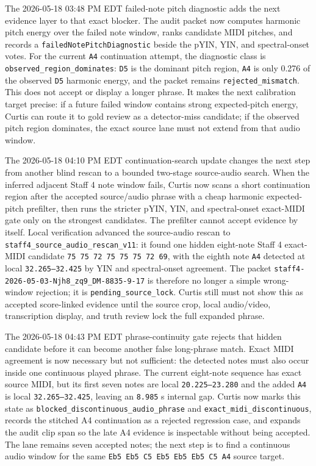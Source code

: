 \documentclass[12pt,letterpaper]{article}
\begin{document}
The 2026-05-18 03:48 PM EDT failed-note pitch diagnostic adds the next evidence layer to that exact blocker. The audit packet now computes harmonic pitch energy over the failed note window, ranks candidate MIDI pitches, and records a \texttt{failedNotePitchDiagnostic} beside the pYIN, YIN, and spectral-onset votes. For the current \texttt{A4} continuation attempt, the diagnostic class is \texttt{observed\_region\_dominates}: \texttt{D5} is the dominant pitch region, \texttt{A4} is only 0.276 of the observed \texttt{D5} harmonic energy, and the packet remains \texttt{rejected\_mismatch}. This does not accept or display a longer phrase. It makes the next calibration target precise: if a future failed window contains strong expected-pitch energy, Curtis can route it to gold review as a detector-miss candidate; if the observed pitch region dominates, the exact source lane must not extend from that audio window.

The 2026-05-18 04:10 PM EDT continuation-search update changes the next step from another blind rescan to a bounded two-stage source-audio search. When the inferred adjacent Staff 4 note window fails, Curtis now scans a short continuation region after the accepted source/audio phrase with a cheap harmonic expected-pitch prefilter, then runs the stricter pYIN, YIN, and spectral-onset exact-MIDI gate only on the strongest candidates. The prefilter cannot accept evidence by itself. Local verification advanced the source-audio rescan to \texttt{staff4\_source\_audio\_rescan\_v11}: it found one hidden eight-note Staff 4 exact-MIDI candidate \texttt{75 75 72 75 75 75 72 69}, with the eighth note \texttt{A4} detected at local \texttt{32.265--32.425} by YIN and spectral-onset agreement. The packet \texttt{staff4-2026-05-03-Njh8\_zq9\_DM-8835-9-17} is therefore no longer a simple wrong-window rejection; it is \texttt{pending\_source\_lock}. Curtis still must not show this as accepted score-linked evidence until the source crop, local audio/video, transcription display, and truth review lock the full expanded phrase.

The 2026-05-18 04:43 PM EDT phrase-continuity gate rejects that hidden candidate before it can become another false long-phrase match. Exact MIDI agreement is now necessary but not sufficient: the detected notes must also occur inside one continuous played phrase. The current eight-note sequence has exact source MIDI, but its first seven notes are local \texttt{20.225--23.280} and the added \texttt{A4} is local \texttt{32.265--32.425}, leaving an \texttt{8.985} s internal gap. Curtis now marks this state as \texttt{blocked\_discontinuous\_audio\_phrase} and \texttt{exact\_midi\_discontinuous}, records the stitched A4 continuation as a rejected regression case, and expands the audit clip span so the late A4 evidence is inspectable without being accepted. The lane remains seven accepted notes; the next step is to find a continuous audio window for the same \texttt{Eb5 Eb5 C5 Eb5 Eb5 Eb5 C5 A4} source target.
\end{document}
